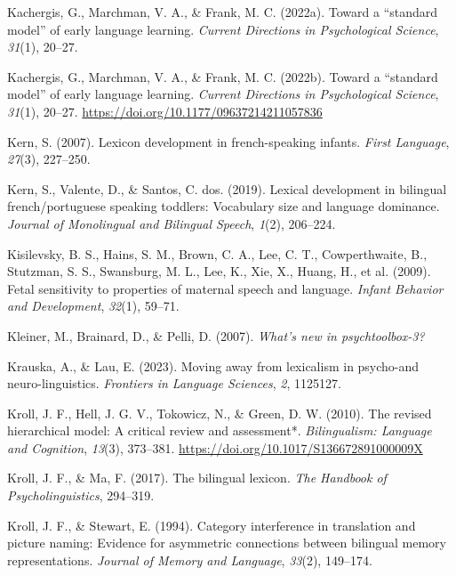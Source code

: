 \documentclass[
  12pt,
  b5paperpaper,
  twoside]{scrreprt}
\newlength{\cslhangindent}
\newlength{\cslentryspacingunit} %
\newenvironment{CSLReferences}[2] %
 {%
  \setlength{\parindent}{0pt}
  \ifodd #1
  \let\oldpar\par
  \def\par{\hangindent=\cslhangindent\oldpar}
  \fi
  \setlength{\parskip}{#2\cslentryspacingunit}
 }%
 {}
\begin{document}
\begin{CSLReferences}{1}{0}
\leavevmode{}%
Kachergis, G., Marchman, V. A., \& Frank, M. C. (2022a). Toward a
{``standard model''} of early language learning. \emph{Current
Directions in Psychological Science}, \emph{31}(1), 20--27.

\leavevmode{}%
Kachergis, G., Marchman, V. A., \& Frank, M. C. (2022b). Toward a
{``standard model''} of early language learning. \emph{Current
Directions in Psychological Science}, \emph{31}(1), 20--27.
\url{https://doi.org/10.1177/09637214211057836}

\leavevmode{}%
Kern, S. (2007). Lexicon development in french-speaking infants.
\emph{First Language}, \emph{27}(3), 227--250.

\leavevmode{}%
Kern, S., Valente, D., \& Santos, C. dos. (2019). Lexical development in
bilingual french/portuguese speaking toddlers: Vocabulary size and
language dominance. \emph{Journal of Monolingual and Bilingual Speech},
\emph{1}(2), 206--224.

\leavevmode{}%
Kisilevsky, B. S., Hains, S. M., Brown, C. A., Lee, C. T.,
Cowperthwaite, B., Stutzman, S. S., Swansburg, M. L., Lee, K., Xie, X.,
Huang, H., et al. (2009). Fetal sensitivity to properties of maternal
speech and language. \emph{Infant Behavior and Development},
\emph{32}(1), 59--71.

\leavevmode{}%
Kleiner, M., Brainard, D., \& Pelli, D. (2007). \emph{What's new in
psychtoolbox-3?}

\leavevmode{}%
Krauska, A., \& Lau, E. (2023). Moving away from lexicalism in
psycho-and neuro-linguistics. \emph{Frontiers in Language Sciences},
\emph{2}, 1125127.

\leavevmode{}%
Kroll, J. F., Hell, J. G. V., Tokowicz, N., \& Green, D. W. (2010). The
revised hierarchical model: A critical review and assessment*.
\emph{Bilingualism: Language and Cognition}, \emph{13}(3), 373--381.
\url{https://doi.org/10.1017/S136672891000009X}

\leavevmode{}%
Kroll, J. F., \& Ma, F. (2017). The bilingual lexicon. \emph{The
Handbook of Psycholinguistics}, 294--319.

\leavevmode{}%
Kroll, J. F., \& Stewart, E. (1994). Category interference in
translation and picture naming: Evidence for asymmetric connections
between bilingual memory representations. \emph{Journal of Memory and
Language}, \emph{33}(2), 149--174.


\end{CSLReferences}
\end{document}
